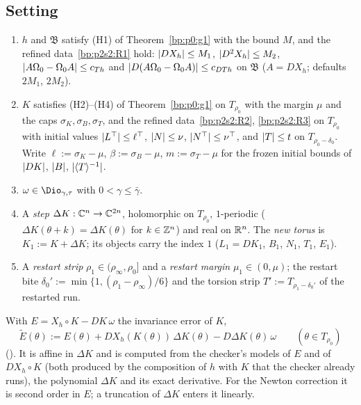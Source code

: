 \subsection{Setting}\label{bp:p2s2hc:sec-set}

\begin{assumption}\label{bp:p2s2hc:standing}
\begin{enumerate}[label=(\alph*)]
\item $h$ and $\mathfrak B$ satisfy (H1) of Theorem~\ref{bp:p0:g1} with the bound $M$, and the refined data~\ref{bp:p2s2:R1} hold: $\lvert DX_h\rvert\le M_1$,
  $\lvert D^2X_h\rvert\le M_2$, $\lvert A\Omega_0-\Omega_0A\rvert\le c_{Th}$ and $\lvert D(A\Omega_0-\Omega_0A)\rvert\le c_{DTh}$ on $\mathfrak B$ ($A=DX_h$; defaults $2M_1$, $2M_2$).
\item $K$ satisfies (H2)--(H4) of Theorem~\ref{bp:p0:g1} on $T_{\rho_0}$ with the margin $\mu$ and the caps $\sigma_K,\sigma_B,\sigma_T$, and the refined
  data~\ref{bp:p2s2:R2}, \ref{bp:p2s2:R3} on $T_{\rho_0}$ with initial values $\lvert L^\top\rvert\le\ell^\top$, $\lvert N\rvert\le\nu$, $\lvert N^\top\rvert\le\nu^\top$, and $\lvert T\rvert\le t$
  on $T_{\rho_0-\delta_0}$. Write $\ell:=\sigma_K-\mu$, $\beta:=\sigma_B-\mu$, $m:=\sigma_T-\mu$ for the frozen initial bounds of $\lvert DK\rvert$, $\lvert B\rvert$, $\lvert \langle T\rangle^{-1}\rvert$.
\item $\omega\in\Dio_{\gamma,\tau}$ with $0<\gamma\le\bar\gamma$.
\item A \emph{step} $\Delta K:\mathbb{C}^n\to\mathbb{C}^{2n}$, holomorphic on $T_{\rho_0}$, $1$-periodic ($\Delta K(\theta+k)=\Delta K(\theta)$ for $k\in\mathbb{Z}^n$) and real on $\mathbb{R}^n$.
  The \emph{new torus} is $K_1:=K+\Delta K$; its objects carry the index $1$ ($L_1=DK_1$, $B_1$, $N_1$, $T_1$, $E_1$).
\item A \emph{restart strip} $\rho_1\in(\rho_\infty,\rho_0]$ and a \emph{restart margin} $\mu_1\in(0,\mu)$; the restart bite $\delta_0':=\min\{1,(\rho_1-\rho_\infty)/6\}$
  and the torsion strip $T':=T_{\rho_1-\delta_0'}$ of the restarted run.
\end{enumerate}
\end{assumption}

\begin{definition}\label{bp:p2s2hc:lin}
With $E=X_h\circ K-DK\,\omega$ the invariance error of $K$,
\[
\tilde E(\theta):=E(\theta)+DX_h(K(\theta))\,\Delta K(\theta)-D\Delta K(\theta)\,\omega \qquad(\theta\in T_{\rho_0})
\]
(). It is affine in $\Delta K$ and is computed from the checker's models of $E$ and of $DX_h\circ K$ (both
produced by the composition of $h$ with $K$ that the checker already runs), the polynomial $\Delta K$ and its exact derivative. For the Newton
correction it is second order in $E$; a truncation of $\Delta K$ enters it linearly.
\end{definition}

